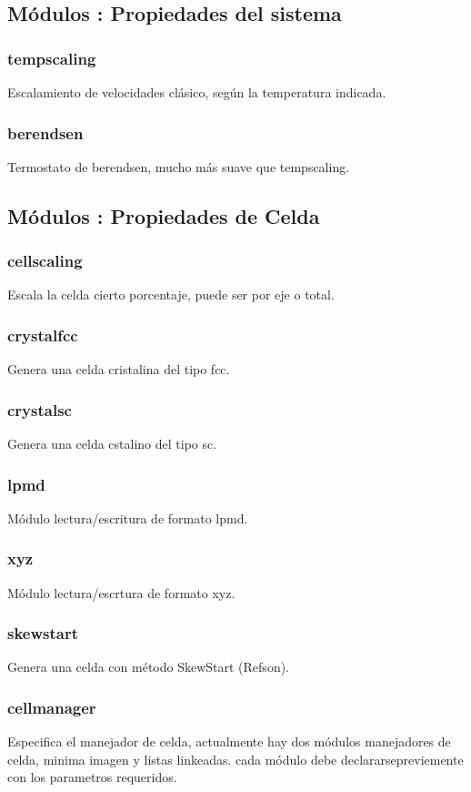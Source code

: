 \documentclass[a4paper,10pt]{scrbook}
\begin{document}
\subsection{M\'odulos : Propiedades del sistema}
\subsubsection{tempscaling}
Escalamiento de velocidades cl\'asico, seg\'un la temperatura indicada.
\subsubsection{berendsen}
Termostato de berendsen, mucho m\'as suave que tempscaling.

\subsection{M\'odulos : Propiedades de Celda}
\subsubsection{cellscaling}
Escala la celda cierto porcentaje, puede ser por eje o total.
\subsubsection{crystalfcc}
Genera una celda cristalina del tipo fcc.
\subsubsection{crystalsc}
Genera una celda cstalino del tipo sc.
\subsubsection{lpmd}
M\'odulo lectura/escritura de formato lpmd.
\subsubsection{xyz}
M\'odulo lectura/escrtura de formato xyz.
\subsubsection{skewstart}
Genera una celda con m\'etodo SkewStart (Refson).
\subsubsection{cellmanager}
Especifica el manejador de celda, actualmente hay dos m\'odulos manejadores de celda, minima imagen y listas linkeadas. cada m\'odulo debe declararsepreviemente con los parametros requeridos.
\end{document}
